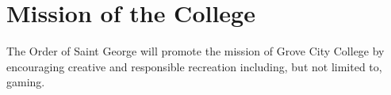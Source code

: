 {
	\section{Mission of the College}
	The Order of Saint George will promote the mission of Grove City College by encouraging creative and responsible recreation including, but not limited to, gaming.
}